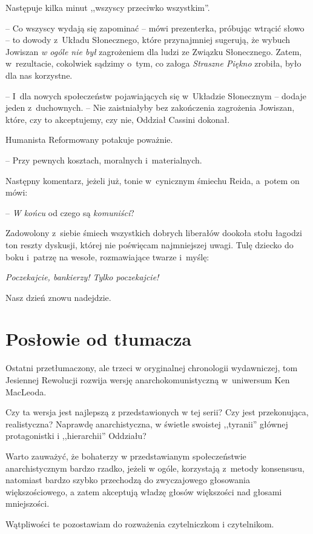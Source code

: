\documentclass[oneside,polish,11pt,sfheadings]{mwbk}
\begin{document}
Następuje kilka minut ,,wszyscy przeciwko wszystkim''.

-- Co wszyscy wydają się zapominać -- mówi prezenterka, próbując wtrącić
słowo -- to dowody z~Układu Słonecznego, które przynajmniej sugerują, że
wybuch Jowiszan \textit{w ogóle nie był} zagrożeniem dla ludzi ze Związku
Słonecznego. Zatem, w~rezultacie, cokolwiek sądzimy o~tym, co załoga
\textit{Straszne Piękno} zrobiła, było dla nas korzystne.

-- I~dla nowych społeczeństw pojawiających się w~Układzie Słonecznym -- dodaje jeden z~duchownych. -- Nie zaistniałyby bez zakończenia zagrożenia
Jowiszan, które, czy to akceptujemy, czy nie, Oddział Cassini dokonał.

Humanista Reformowany potakuje poważnie. 

-- Przy pewnych kosztach,
moralnych i~materialnych.

Następny komentarz, jeżeli już, tonie w~cynicznym śmiechu Reida, a~potem
on mówi: 

-- \textit{W końcu }od czego są \textit{komuniści}?

Zadowolony z~siebie śmiech wszystkich dobrych liberałów dookoła stołu
łagodzi ton reszty dyskusji, której nie poświęcam najmniejszej uwagi.
Tulę dziecko do boku i~patrzę na wesołe, rozmawiające twarze i~myślę:

\textit{Poczekajcie, bankierzy! Tylko poczekajcie!} 

Nasz dzień znowu nadejdzie.


\chapter*{Posłowie od tłumacza}

Ostatni przetłumaczony, ale trzeci w oryginalnej chronologii wydawniczej, tom Jesiennej Rewolucji rozwija wersję anarchokomunistyczną w~uniwersum Ken MacLeoda. 

Czy ta wersja jest najlepszą z przedstawionych w tej serii? Czy jest przekonująca, realistyczna? Naprawdę anarchistyczna, w świetle swoistej ,,tyranii'' głównej protagonistki i ,,hierarchii'' Oddziału? 

Warto zauważyć, że bohaterzy w przedstawianym społeczeństwie anarchistycznym bardzo rzadko, jeżeli w ogóle, korzystają z~metody konsensusu, natomiast bardzo szybko przechodzą do zwyczajowego głosowania większościowego, a zatem akceptują władzę głosów większości nad głosami mniejszości.

Wątpliwości te pozostawiam do rozważenia czytelniczkom i czytelnikom.
\end{document}
